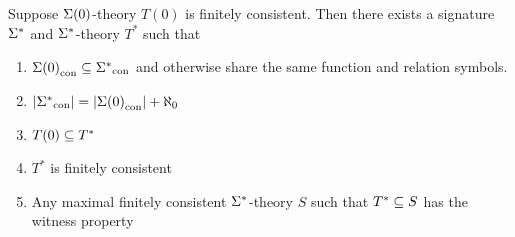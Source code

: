 \begin{prop}
    Suppose $\Sigma(0)$-theory 
    $T(0)$ is finitely consistent.
    Then there exists a signature 
    $\Sigma^*$ and $\Sigma^*$-theory $T^*$ such that 
    \begin{enumerate}
        \item ${\Sigma(0)}_\mathrm{con} \subseteq {\Sigma^*}_\mathrm{con}$
        and otherwise share the same function and relation symbols.
        \item $|{\Sigma^*}_\mathrm{con}| = |{\Sigma(0)}_\mathrm{con}| + \aleph_0$
        \item $T(0) \subseteq T^*$
        \item $T^*$ is finitely consistent
        \item Any maximal finitely consistent 
        $\Sigma^*$-theory $S$ such that $T^* \subseteq S$ 
        has the witness property
    \end{enumerate}
\end{prop}
